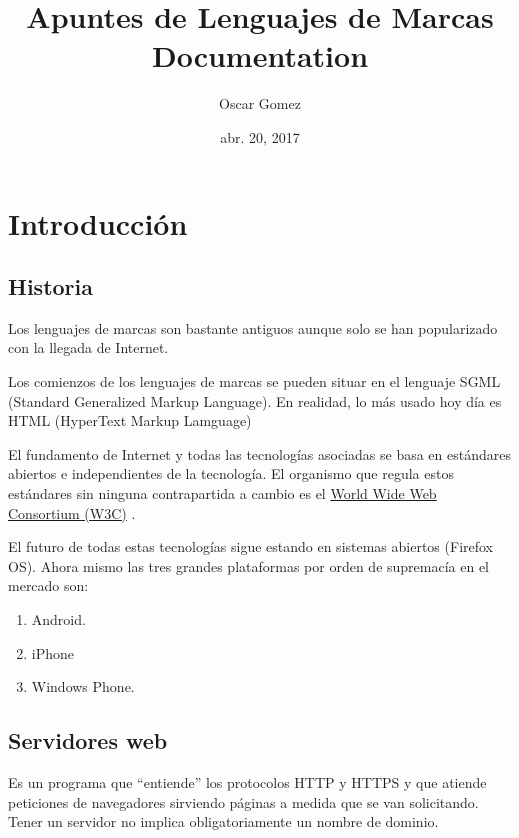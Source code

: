 \documentclass[letterpaper,10pt,spanish]{sphinxmanual}
\title{Apuntes de Lenguajes de Marcas Documentation}
\date{abr. 20, 2017}
\author{Oscar Gomez}
\begin{document}
\maketitle
\tableofcontents
{}\label{index::doc}



\chapter{Introducción}
\label{tema1:introduccion}\label{tema1::doc}\label{tema1:apuntes-de-lenguajes-de-marcas}

\section{Historia}
\label{tema1:historia}
Los lenguajes de marcas son bastante antiguos aunque solo se han popularizado con la llegada de Internet.

Los comienzos de los lenguajes de marcas se pueden situar en el lenguaje SGML (Standard Generalized Markup Language). En realidad, lo más usado hoy día es HTML (HyperText Markup Lamguage)

El fundamento de Internet y todas las tecnologías asociadas se basa en estándares abiertos e
independientes de la tecnología. El organismo que regula estos estándares sin ninguna contrapartida a cambio es el \href{http://www.w3c.org}{World Wide Web Consortium (W3C)} .

El futuro de todas estas tecnologías sigue estando en sistemas abiertos (Firefox OS). Ahora mismo las tres grandes plataformas por orden de supremacía en el mercado son:
\begin{enumerate}
\item {} 
Android.

\item {} 
iPhone

\item {} 
Windows Phone.

\end{enumerate}


\section{Servidores web}
\label{tema1:servidores-web}
Es un programa que “entiende” los protocolos HTTP y HTTPS y que atiende peticiones de navegadores
sirviendo páginas a medida que se van solicitando. Tener un servidor no implica obligatoriamente un nombre de dominio.
\end{document}
